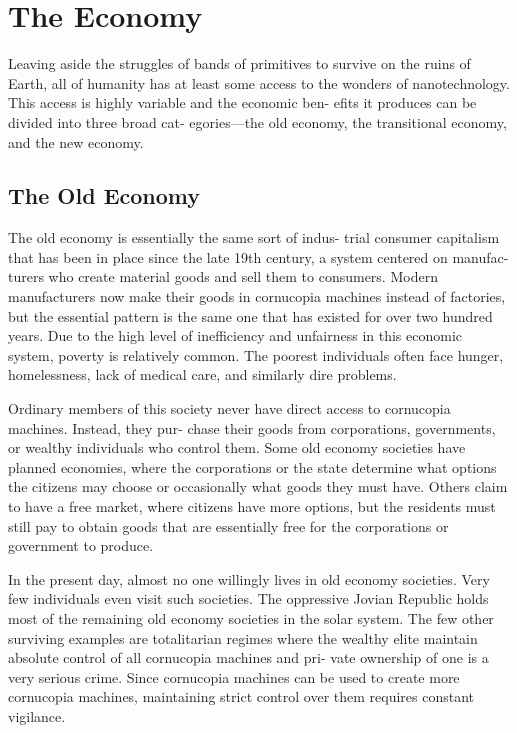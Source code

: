 \section{The Economy}

Leaving aside the struggles of bands of primitives to 
survive on the ruins of Earth, all of humanity has at 
least some access to the wonders of nanotechnology. 
This access is highly variable and the economic ben-
efits it produces can be divided into three broad cat-
egories—the old economy, the transitional economy, 
and the new economy.

\subsection{The Old Economy}

The old economy is essentially the same sort of indus-
trial consumer capitalism that has been in place since 
the late 19th century, a system centered on manufac-
turers who create material goods and sell them to 
consumers. Modern manufacturers now make their 
goods in cornucopia machines instead of factories, but 
the essential pattern is the same one that has existed 
for over two hundred years. Due to the high level of 
inefficiency and unfairness in this economic system, 
poverty is relatively common. The poorest individuals 
often face hunger, homelessness, lack of medical care, 
and similarly dire problems.

Ordinary members of this society never have direct 
access to cornucopia machines. Instead, they pur-
chase their goods from corporations, governments, 
or wealthy individuals who control them. Some old 
economy societies have planned economies, where the 
corporations or the state determine what options the 
citizens may choose or occasionally what goods they 
must have. Others claim to have a free market, where 
citizens have more options, but the residents must still 
pay to obtain goods that are essentially free for the 
corporations or government to produce.

In the present day, almost no one willingly lives in 
old economy societies. Very few individuals even visit 
such societies. The oppressive Jovian Republic holds 
most of the remaining old economy societies in the 
solar system. The few other surviving examples are 
totalitarian regimes where the wealthy elite maintain 
absolute control of all cornucopia machines and pri-
vate ownership of one is a very serious crime. Since 
cornucopia machines can be used to create more 
cornucopia machines, maintaining strict control over 
them requires constant vigilance.

